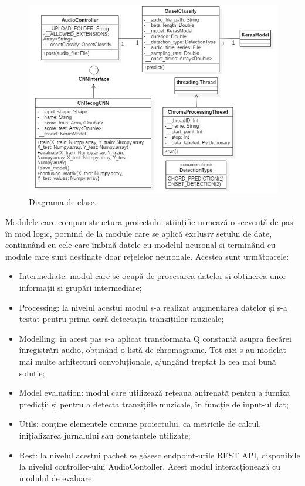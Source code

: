 \documentclass[a4paper,12pt]{report}
\begin{document}
\begin{figure}[h!]
    \centering
    \includegraphics[width=15.8cm]{..//resources//images//class_diagram.JPG} 
    \caption{Diagrama de clase.}
\end{figure}
\newpage

Modulele care compun structura proiectului științific urmează o secvență 
de pași în mod logic, pornind de la module care se aplică exclusiv setului de date, 
continuând cu cele care îmbină datele cu modelul neuronal și terminând cu 
module care sunt destinate doar rețelelor neuronale. Acestea sunt următoarele:
\begin{itemize}
    \setlength\itemsep{0.2em}
    \item Intermediate: modul care se ocupă de procesarea 
    datelor și obținerea unor informații și grupări intermediare;
    \item Processing: la nivelul acestui modul s-a realizat augmentarea datelor 
și s-a testat pentru prima oară detectația tranzițiilor muzicale;
    \item Modelling: în acest pas s-a aplicat transformata Q constantă asupra 
fiecărei înregistrări audio, obținând o listă de chromagrame. Tot aici s-au 
modelat mai multe arhitecturi convoluționale, ajungând treptat la cea mai 
bună soluție;
    \item Model evaluation: modul care utilizează rețeaua antrenată pentru a
furniza predicții și pentru a detecta tranzițiile muzicale, în funcție de 
input-ul dat;
    \item Utils: conține elementele comune proiectului, ca metricile de calcul,
inițializarea jurnalului sau constantele utilizate;
    \item Rest: la nivelul acestui pachet se găsesc endpoint-urile REST API,
disponibile la nivelul controller-ului AudioContoller. Acest modul interacționează
cu modulul de evaluare. 
\end{itemize}
\end{document}
